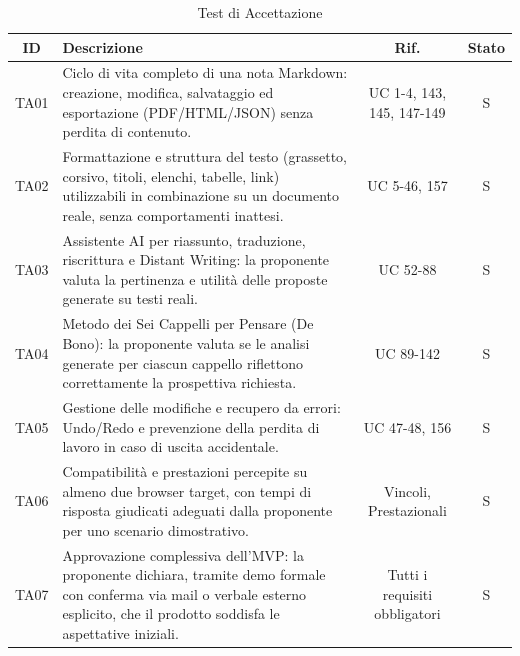 \renewcommand{\arraystretch}{1.3}
\begin{table}[H]
    \centering
    \begin{tabularx}{\textwidth}{|c|X|c|c|}
        \hline
        \rowcolor{primarycolor!10}
        \textbf{ID} & \textbf{Descrizione} & \textbf{Rif.} & \textbf{Stato} \\
        \hline
        TA01 & Ciclo di vita completo di una nota Markdown: creazione, modifica, salvataggio ed esportazione (PDF/HTML/JSON) senza perdita di contenuto. & UC 1-4, 143, 145, 147-149 & S \\
        \hline
        TA02 & Formattazione e struttura del testo (grassetto, corsivo, titoli, elenchi, tabelle, link) utilizzabili in combinazione su un documento reale, senza comportamenti inattesi. & UC 5-46, 157 & S \\
        \hline
        TA03 & Assistente AI per riassunto, traduzione, riscrittura e Distant Writing: la proponente valuta la pertinenza e utilità delle proposte generate su testi reali. & UC 52-88 & S \\
        \hline
        TA04 & Metodo dei Sei Cappelli per Pensare (De Bono): la proponente valuta se le analisi generate per ciascun cappello riflettono correttamente la prospettiva richiesta. & UC 89-142 & S \\
        \hline
        TA05 & Gestione delle modifiche e recupero da errori: Undo/Redo e prevenzione della perdita di lavoro in caso di uscita accidentale. & UC 47-48, 156 & S \\
        \hline
        TA06 & Compatibilità e prestazioni percepite su almeno due browser target, con tempi di risposta giudicati adeguati dalla proponente per uno scenario dimostrativo. & Vincoli, Prestazionali & S \\
        \hline
        TA07 & Approvazione complessiva dell'MVP: la proponente dichiara, tramite demo formale con conferma via mail o verbale esterno esplicito, che il prodotto soddisfa le aspettative iniziali. & Tutti i requisiti obbligatori & S \\
        \hline
    \end{tabularx}
    \caption{Test di Accettazione}
\end{table}
